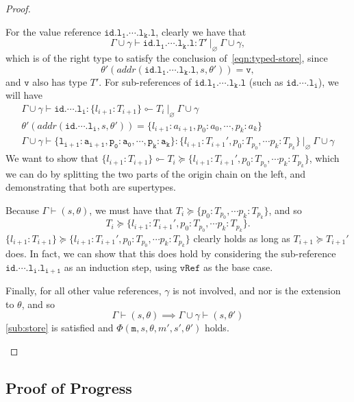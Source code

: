 \documentclass[12pt,a4paper,twoside,openright]{report}
\theoremstyle{definition}
\theoremstyle{dotless}
\newcommand*{\orig}{\ensuremath{\!\multimapinv\!}}
\begin{document}
\begin{proof}
\begin{case}[Assign]
\begin{subcase}[PropAssignType]
	  For the value reference $\mathtt{id.l_1.\cdots.l_k.l}$, clearly we have that
	  $$\Gamma\!\cup\!\gamma\vdash\mathtt{id.l_1.\cdots.l_k.l}:T'\ |_\varnothing\ \Gamma\!\cup\!\gamma,$$
	  which is of the right type to satisfy the conclusion
	  of~\eqref{eqn:typed-store}, since
	  $$\theta'(addr(\mathtt{id.l_1.\cdots.l_k.l},s, \theta')) = \mathtt{v},$$
	  and $\mathtt{v}$ also has type $T'$.
	  For sub-references of $\mathtt{id.l_1.\cdots.l_k.l}$ (such as $\mathtt{id.\cdots.l_i}$), we will have
	  \begin{gather*}
		\Gamma\!\cup\!\gamma\vdash\mathtt{id.\cdots.l_i}:\{l_{i+1}:T_{i+1}\}\orig T_i\ |_\varnothing\ \Gamma\!\cup\!\gamma \\
		\theta'(addr(\mathtt{id.\cdots.l_i},s,\theta'))	= \{l_{i+1}:a_{i+1}, p_0:a_0,\cdots,p_k:a_k\} \\
		\Gamma\!\cup\!\gamma\vdash\mathtt{\{l_{i+1}:a_{i+1}, p_0:a_0,\cdots,p_k:a_k\}} 
		:\{l_{i+1}:T_{i+1}', p_0:T_{p_0},\cdots p_k:T_{p_k}\}\ |_\varnothing\ \Gamma\!\cup\!\gamma
	  \end{gather*}
	  We want to show that $\{l_{i+1}:T_{i+1}\}\orig T_i\succeq \{l_{i+1}:T_{i+1}', p_0:T_{p_0},\cdots p_k:T_{p_k}\}$, which we can 
	  do by splitting the two parts of the origin chain on the left, and demonstrating that both
	  are supertypes.

	  Because $\Gamma\vdash(s,\theta)$, we must have that $T_i\succeq\{p_0:T_{p_0},\cdots p_k:T_{p_k}\}$, and so 
	  $$T_i\succeq\{l_{i+1}:T_{i+1}', p_0:T_{p_0},\cdots p_k:T_{p_k}\}.$$
	  $\{l_{i+1}:T_{i+1}\}\succeq \{l_{i+1}:T_{i+1}', p_0:T_{p_0},\cdots p_k:T_{p_k}\}$ clearly
	  holds as long as $T_{i+1}\succeq T_{i+1}'$ does. In fact, we can show that this does hold
	  by considering the sub-reference $\mathtt{id.\cdots.l_i.l_{i+1}}$ as an induction
	  step, using $\mathtt{vRef}$ as the base case.

	  Finally, for all other value references, $\gamma$ is not involved, and
	  nor is the extension to $\theta$, and so
	  $$\Gamma\vdash(s,\theta)\implies\Gamma\!\cup\!\gamma\vdash(s,\theta')$$ 
	  \eqref{sub:store} is satisfied and $\Phi(\mathtt{m},s,\theta,m',s',\theta')$ holds.

	\end{subcase}

  \end{case}

\end{proof}

\subsection{Proof of Progress}
\end{document}
